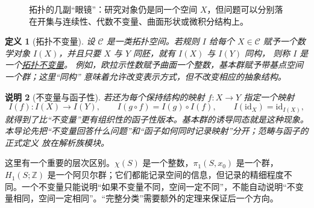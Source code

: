 \documentclass[UTF8,fontset=none,a4paper,11pt]{ctexart}
\theoremstyle{foundation-definition}
\newtheorem{definition}{定义}[section]
\theoremstyle{foundation-theorem}
\theoremstyle{foundation-proposition}
\theoremstyle{foundation-example}
\theoremstyle{foundation-remark}
\newtheorem{remark}[definition]{说明}
\theoremstyle{foundation-theorem}
\newcommand{\term}[2]{\hyperref[#1]{#2}}
\begin{document}
\begin{figure}[htbp]
\centering
{}
\caption{拓扑的几副“眼镜”：研究对象仍是同一个空间 \(X\)，但问题可以分别落在开集与连续性、代数不变量、曲面形状或微积分结构上。}
\label{fig:topology-branch-map}
\end{figure}

\begin{definition}[拓扑不变量]\label{def:topological-invariant}
设 \(\mathcal C\) 是一类拓扑空间。若规则 \(I\) 给每个 \(X\in\mathcal C\) 赋予一个数学对象
\(I(X)\)，并且只要 \(X\) 与 \(Y\) 同胚，就有 \(I(X)\) 与 \(I(Y)\) 同构，
则称 \(I\) 是一个\term{def:topological-invariant}{拓扑不变量}。
例如，欧拉示性数赋予曲面一个整数，基本群赋予带基点空间一个群；这里“同构”
意味着允许改变表示方式，但不改变相应的抽象结构。
\end{definition}

\begin{remark}[不变量与函子性]\label{rem:functorial-invariant}
若还为每个保持结构的映射 \(f:X\to Y\) 指定一个映射
\[
I(f):I(X)\to I(Y),\qquad
I(g\circ f)=I(g)\circ I(f),\qquad
I(\mathrm{id}_X)=\mathrm{id}_{I(X)},
\]
就得到了比“不变量”更有组织性的函子性版本。基本群的诱导同态就是这种现象。
本导论先把“不变量回答什么问题”和“函子如何同时记录映射”分开；范畴与函子的正式定义
放在解析族模块。
\end{remark}

这里有一个重要的层次区别。\(\chi(S)\) 是一个整数，\(\pi_1(S,x_0)\) 是一个群，\(H_1(S;\mathbb Z)\) 是一个阿贝尔群；它们都能记录空间的信息，但记录的精细程度不同。一个不变量只能说明“如果不变量不同，空间一定不同”，不能自动说明“不变量相同，空间一定相同”。“完整分类”需要额外的定理来保证后一个方向。
\end{document}
